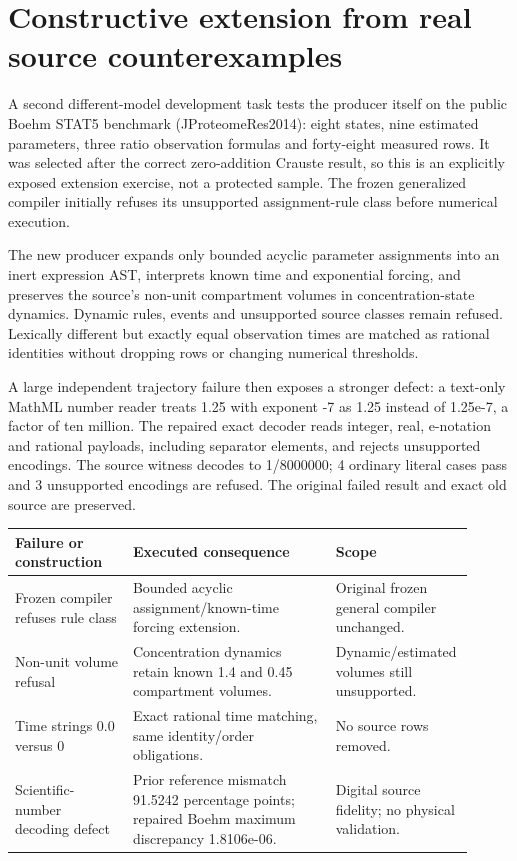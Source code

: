 \documentclass[11pt,letterpaper]{article}
\begin{document}
\section{Constructive extension from real source counterexamples}
A second different-model development task tests the producer itself on the public Boehm STAT5 benchmark (JProteomeRes2014): eight states, nine estimated parameters, three ratio observation formulas and forty-eight measured rows. It was selected after the correct zero-addition Crauste result, so this is an explicitly exposed extension exercise, not a protected sample. The frozen generalized compiler initially refuses its unsupported assignment-rule class before numerical execution.\par
The new producer expands only bounded acyclic parameter assignments into an inert expression AST, interprets known time and exponential forcing, and preserves the source's non-unit compartment volumes in concentration-state dynamics. Dynamic rules, events and unsupported source classes remain refused. Lexically different but exactly equal observation times are matched as rational identities without dropping rows or changing numerical thresholds.\par
A large independent trajectory failure then exposes a stronger defect: a text-only MathML number reader treats 1.25 with exponent -7 as 1.25 instead of 1.25e-7, a factor of ten million. The repaired exact decoder reads integer, real, e-notation and rational payloads, including separator elements, and rejects unsupported encodings. The source witness decodes to 1/8000000; 4 ordinary literal cases pass and 3 unsupported encodings are refused. The original failed result and exact old source are preserved.\par
\begingroup\small\begin{longtable}{>{\raggedright\arraybackslash}p{0.25\linewidth}>{\raggedright\arraybackslash}p{0.43\linewidth}>{\raggedright\arraybackslash}p{0.23\linewidth}}\toprule
\textbf{Failure or construction} & \textbf{Executed consequence} & \textbf{Scope}\\\midrule\endhead
Frozen compiler refuses rule class & Bounded acyclic assignment/known-time forcing extension. & Original frozen general compiler unchanged.\\
Non-unit volume refusal & Concentration dynamics retain known 1.4 and 0.45 compartment volumes. & Dynamic/estimated volumes still unsupported.\\
Time strings 0.0 versus 0 & Exact rational time matching, same identity/order obligations. & No source rows removed.\\
Scientific-number decoding defect & Prior reference mismatch 91.5242 percentage points; repaired Boehm maximum discrepancy 1.8106e-06. & Digital source fidelity; no physical validation.\\
\bottomrule\end{longtable}\endgroup
\end{document}
